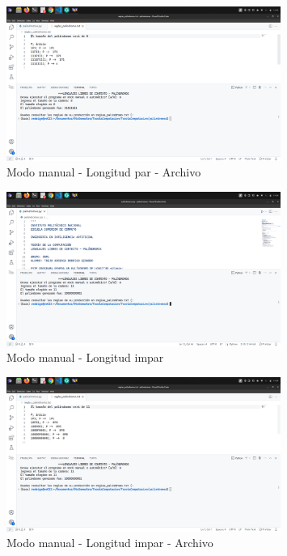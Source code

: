 \documentclass[11pt]{article} %
\begin{document}
	\begin{figure}[h]
		\centering
		\includegraphics[width=0.8\textwidth]{arch1}
		\caption{Modo manual - Longitud par - Archivo}
	\end{figure}
	
	\newpage
	
	\begin{figure}[h]
		\centering
		\includegraphics[width=0.8\textwidth]{manual2}
		\caption{Modo manual - Longitud impar}
	\end{figure}
	
	\begin{figure}[h]
		\centering
		\includegraphics[width=0.8\textwidth]{arch2}
		\caption{Modo manual - Longitud impar - Archivo}
	\end{figure}
	
\end{document}
